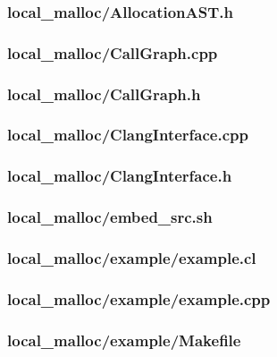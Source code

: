 \documentclass{article}
\begin{document}
\subsubsection*{local\_malloc/AllocationAST.h}


\subsubsection*{local\_malloc/CallGraph.cpp}


\subsubsection*{local\_malloc/CallGraph.h}


\subsubsection*{local\_malloc/ClangInterface.cpp}


\subsubsection*{local\_malloc/ClangInterface.h}


\subsubsection*{local\_malloc/embed\_src.sh}


\subsubsection*{local\_malloc/example/example.cl}


\subsubsection*{local\_malloc/example/example.cpp}


\subsubsection*{local\_malloc/example/Makefile}

\end{document}
